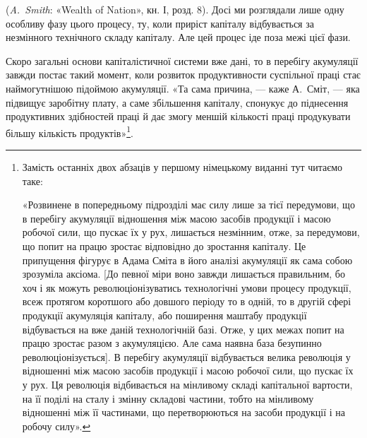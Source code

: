 \parcont{}  %
(\emph{A.~Smith}: «Wealth of Nation», кн. І, розд. 8). Досі ми розглядали
лише одну особливу фазу цього процесу, ту, коли приріст капіталу
відбувається за незмінного технічного складу капіталу.
Але цей процес іде поза межі цієї фази.

Скоро загальні основи капіталістичної системи вже дані, то
в перебігу акумуляції завжди постає такий момент, коли розвиток
продуктивности суспільної праці стає наймогутнішою
підоймою акумуляції. «Та сама причина, — каже А.~Сміт, —
яка підвищує заробітну плату, а саме збільшення капіталу,
спонукує до піднесення продуктивних здібностей праці й дає
змогу меншій кількості праці продукувати більшу кількість
продуктів»\footnote*{
Замість останніх двох абзаців у першому німецькому виданні
тут читаємо таке:

«Розвинене в попередньому підрозділі має силу лише за тієї передумови,
що в перебігу акумуляції відношення між масою засобів продукції і
масою робочої сили, що пускає їх у рух, лишається незмінним, отже,
за передумови, що попит на працю зростає відповідно до зростання капіталу.
Це припущення фігурує в Адама Сміта в його аналізі акумуляції
як сама собою зрозуміла аксіома. [До певної міри воно завжди лишається
правильним, бо хоч і як можуть революціонізуватись технологічні умови
процесу продукції, всеж протягом коротшого або довшого періоду то в одній,
то в другій сфері продукції акумуляція капіталу, або поширення маштабу
продукції відбувається на вже даній технологічній базі. Отже, у цих межах
попит на працю зростає разом з акумуляцією. Але сама наявна база
безупинно революціонізується]\footnotemarkZ{}.
В перебігу акумуляції відбувається
велика революція у відношенні між масою засобів продукції і масою робочої
сили, що пускає їх у рух. Ця революція відбивається на мінливому
складі капітальної вартости, на її поділі на сталу і змінну складові частини,
тобто на мінливому відношенні між її частинами, що перетворюються
на засоби продукції і на робочу силу». 
}.

